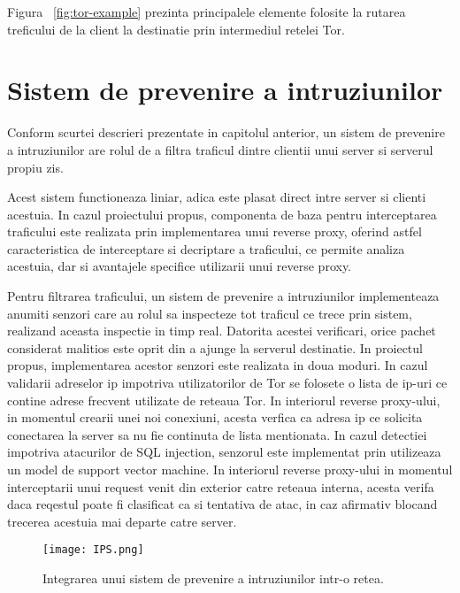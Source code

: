 Figura ~\ref{fig:tor-example} prezinta principalele elemente folosite la rutarea treficului de la client la destinatie prin intermediul retelei Tor. \\
\section{Sistem de prevenire a intruziunilor}
Conform scurtei descrieri prezentate in capitolul anterior, un sistem de prevenire a intruziunilor are rolul de a filtra traficul dintre clientii unui server si serverul propiu zis. 

Acest sistem functioneaza liniar, adica este plasat direct intre server si clienti acestuia. In cazul proiectului propus, componenta de baza pentru interceptarea traficului este realizata prin implementarea unui reverse proxy, oferind astfel caracteristica de interceptare si decriptare a traficului, ce permite analiza acestuia, dar si avantajele specifice utilizarii unui reverse proxy.

Pentru filtrarea traficului, un sistem de prevenire a intruziunilor implementeaza anumiti senzori care au rolul sa inspecteze tot traficul ce trece prin sistem, realizand aceasta inspectie in timp real. Datorita acestei verificari, orice pachet considerat malitios este oprit din a ajunge la serverul destinatie. In proiectul propus, implementarea acestor senzori este realizata in doua moduri. In cazul validarii adreselor ip impotriva utilizatorilor de Tor se folosete o lista de ip-uri ce contine adrese frecvent utilizate de reteaua Tor. In interiorul reverse proxy-ului, in momentul crearii unei noi conexiuni, acesta verfica ca adresa ip ce solicita conectarea la server sa nu fie continuta de lista mentionata. In cazul detectiei impotriva atacurilor de SQL injection, senzorul este implementat prin utilizeaza un model de support vector machine. In interiorul reverse proxy-ului in momentul interceptarii unui request venit din exterior catre reteaua interna, acesta verifa daca reqestul poate fi clasificat ca si tentativa de atac, in caz afirmativ blocand trecerea acestuia mai departe catre server.
\begin{figure}[h]
	\centering
	\texttt{[image: IPS.png]}
	\caption{Integrarea unui sistem de prevenire a intruziunilor intr-o retea.}
	\label{fig:ips-2nd-example}
\end{figure}

